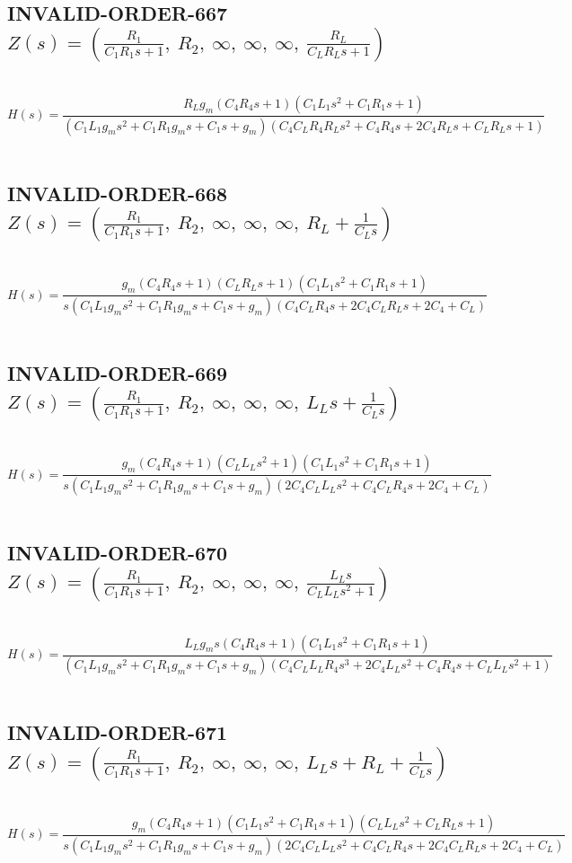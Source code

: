 \documentclass{article}
\begin{document}
\subsection{INVALID-ORDER-667 $Z(s) = \left( \frac{R_{1}}{C_{1} R_{1} s + 1}, \  R_{2}, \  \infty, \  \infty, \  \infty, \  \frac{R_{L}}{C_{L} R_{L} s + 1}\right)$ } \ 
\textbf{\[H(s) = \frac{R_{L} g_{m} \left(C_{4} R_{4} s + 1\right) \left(C_{1} L_{1} s^{2} + C_{1} R_{1} s + 1\right)}{\left(C_{1} L_{1} g_{m} s^{2} + C_{1} R_{1} g_{m} s + C_{1} s + g_{m}\right) \left(C_{4} C_{L} R_{4} R_{L} s^{2} + C_{4} R_{4} s + 2 C_{4} R_{L} s + C_{L} R_{L} s + 1\right)}\] } \ 
\subsection{INVALID-ORDER-668 $Z(s) = \left( \frac{R_{1}}{C_{1} R_{1} s + 1}, \  R_{2}, \  \infty, \  \infty, \  \infty, \  R_{L} + \frac{1}{C_{L} s}\right)$ } \ 
\textbf{\[H(s) = \frac{g_{m} \left(C_{4} R_{4} s + 1\right) \left(C_{L} R_{L} s + 1\right) \left(C_{1} L_{1} s^{2} + C_{1} R_{1} s + 1\right)}{s \left(C_{1} L_{1} g_{m} s^{2} + C_{1} R_{1} g_{m} s + C_{1} s + g_{m}\right) \left(C_{4} C_{L} R_{4} s + 2 C_{4} C_{L} R_{L} s + 2 C_{4} + C_{L}\right)}\] } \ 
\subsection{INVALID-ORDER-669 $Z(s) = \left( \frac{R_{1}}{C_{1} R_{1} s + 1}, \  R_{2}, \  \infty, \  \infty, \  \infty, \  L_{L} s + \frac{1}{C_{L} s}\right)$ } \ 
\textbf{\[H(s) = \frac{g_{m} \left(C_{4} R_{4} s + 1\right) \left(C_{L} L_{L} s^{2} + 1\right) \left(C_{1} L_{1} s^{2} + C_{1} R_{1} s + 1\right)}{s \left(C_{1} L_{1} g_{m} s^{2} + C_{1} R_{1} g_{m} s + C_{1} s + g_{m}\right) \left(2 C_{4} C_{L} L_{L} s^{2} + C_{4} C_{L} R_{4} s + 2 C_{4} + C_{L}\right)}\] } \ 
\subsection{INVALID-ORDER-670 $Z(s) = \left( \frac{R_{1}}{C_{1} R_{1} s + 1}, \  R_{2}, \  \infty, \  \infty, \  \infty, \  \frac{L_{L} s}{C_{L} L_{L} s^{2} + 1}\right)$ } \ 
\textbf{\[H(s) = \frac{L_{L} g_{m} s \left(C_{4} R_{4} s + 1\right) \left(C_{1} L_{1} s^{2} + C_{1} R_{1} s + 1\right)}{\left(C_{1} L_{1} g_{m} s^{2} + C_{1} R_{1} g_{m} s + C_{1} s + g_{m}\right) \left(C_{4} C_{L} L_{L} R_{4} s^{3} + 2 C_{4} L_{L} s^{2} + C_{4} R_{4} s + C_{L} L_{L} s^{2} + 1\right)}\] } \ 
\subsection{INVALID-ORDER-671 $Z(s) = \left( \frac{R_{1}}{C_{1} R_{1} s + 1}, \  R_{2}, \  \infty, \  \infty, \  \infty, \  L_{L} s + R_{L} + \frac{1}{C_{L} s}\right)$ } \ 
\textbf{\[H(s) = \frac{g_{m} \left(C_{4} R_{4} s + 1\right) \left(C_{1} L_{1} s^{2} + C_{1} R_{1} s + 1\right) \left(C_{L} L_{L} s^{2} + C_{L} R_{L} s + 1\right)}{s \left(C_{1} L_{1} g_{m} s^{2} + C_{1} R_{1} g_{m} s + C_{1} s + g_{m}\right) \left(2 C_{4} C_{L} L_{L} s^{2} + C_{4} C_{L} R_{4} s + 2 C_{4} C_{L} R_{L} s + 2 C_{4} + C_{L}\right)}\] } \ 
\end{document}
